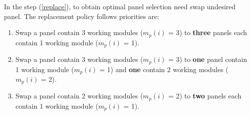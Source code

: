 \documentclass[conference]{IEEEtran}
\begin{document}
In the step (\ref{replace}), to obtain optimal panel selection need swap undesired panel. The replacement policy follows priorities are:
\begin{enumerate} [1- ]
\item Swap a panel contain 3 working modules ($m_p(i)$ = 3) to \textbf{three} panels each contain 1 working module ($m_p(i)$ = 1).
\item Swap a panel contain 3 working modules ($m_p(i)$ = 3) to \textbf{one} panel contain 1 working module ($m_p(i)$ = 1) and \textbf{one} contain 2 working modules ($m_p(i)$ = 2).
\item Swap a panel contain 2 working modules ($m_p(i)$ = 2) to \textbf{two} panels each contain 1 working module ($m_p(i)$ = 1).
\end{enumerate}



\end{document}
